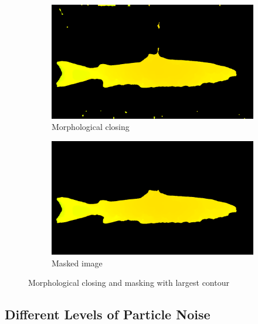 \begin{figure}[H]
    \medskip
    \begin{subfigure}{0.48\textwidth}
        \includegraphics[width=\linewidth]{images/implementation/5_closing_on_color_filtered_image}
        \caption{Morphological closing} 
        \label{fig:morphological_closing}
    \end{subfigure}\hspace*{\fill}
    \begin{subfigure}{0.48\textwidth}
        \includegraphics[width=\linewidth]{images/implementation/6_masked_source}
        \caption{Masked image} 
        \label{fig:masked_source}
    \end{subfigure}
    \caption{Morphological closing and masking with largest contour} 
    \label{fig:algorithm}
\end{figure}




\subsection{Different Levels of Particle Noise}

